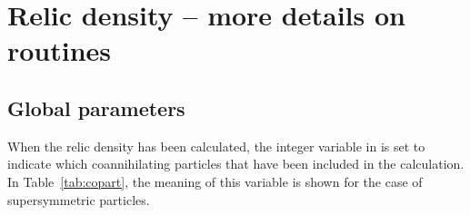 \section{Relic density -- more details on routines}

\subsection{Global parameters}

When the relic density has been calculated, the integer variable  in  is set to indicate which coannihilating particles that have been included in the calculation. In Table~\ref{tab:copart}, the meaning of this variable is shown for the case of supersymmetric particles.

